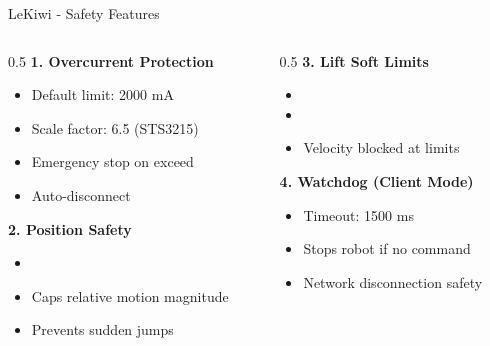 \begin{frame}{LeKiwi - Safety Features}
\begin{columns}
\begin{column}{0.5\textwidth}
    \textbf{1. Overcurrent Protection}
    \begin{itemize}
        \item Default limit: 2000 mA
        \item Scale factor: 6.5 (STS3215)
        \item Emergency stop on exceed
        \item Auto-disconnect
    \end{itemize}

    \vspace{0.3cm}

    \textbf{2. Position Safety}
    \begin{itemize}
        \item {}
        \item Caps relative motion magnitude
        \item Prevents sudden jumps
    \end{itemize}
\end{column}
\begin{column}{0.5\textwidth}
    \textbf{3. Lift Soft Limits}
    \begin{itemize}
        \item {}
        \item {}
        \item Velocity blocked at limits
    \end{itemize}

    \vspace{0.3cm}

    \textbf{4. Watchdog (Client Mode)}
    \begin{itemize}
        \item Timeout: 1500 ms
        \item Stops robot if no command
        \item Network disconnection safety
    \end{itemize}
\end{column}
\end{columns}
\end{frame}

